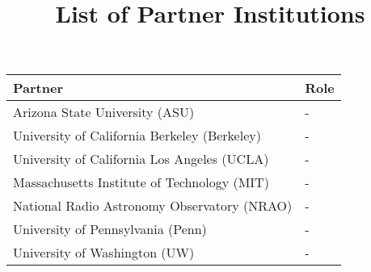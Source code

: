 \documentclass[preprint]{aastex}
\begin{document}
\title{List of Partner Institutions}

\begin{tabular}{| p{} | p{} |} \hline
\textbf{Partner} & \textbf{Role} \\ \hline
Arizona State University (ASU) & - \\ \hline
University of California Berkeley (Berkeley) & - \\ \hline
University of California Los Angeles (UCLA) & - \\ \hline
Massachusetts Institute of Technology (MIT) & - \\ \hline
National Radio Astronomy Observatory (NRAO) & - \\ \hline
University of Pennsylvania (Penn) & - \\ \hline
University of Washington (UW) & - \\ \hline
\end{tabular}
\end{document}
